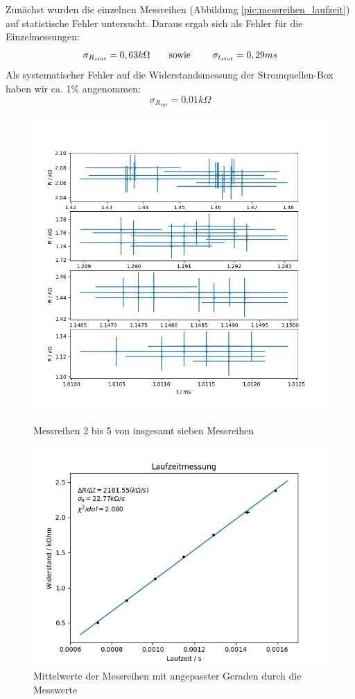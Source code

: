 \documentclass[a4paper]{article}
\begin{document}
	Zunächst wurden die einzelnen Messreihen (Abbildung \ref{pic:messreihen_laufzeit}) auf statistische Fehler untersucht. Daraus ergab sich als Fehler für die Einzelmessungen:
	\begin{equation}
	\sigma _{R_{stat}} = 0,63 k\Omega \text{\qquad sowie \qquad} \sigma_{t_{stat}} = 0,29 ms
	\end{equation}
	Als systematischer Fehler auf die Widerstandsmessung der Stromquellen-Box haben wir ca. 1\% angenommen: 
	\begin{equation}
	\sigma_{R_{sys}} = 0.01 k \Omega
	\end{equation}
	\begin{figure}
	\begin{center}
		\includegraphics[width=0.75\linewidth]{messreihen_2bis5_laufzeit}
		\caption{Messreihen 2 bis 5 von insgesamt sieben Messreihen}
		\label{pic:messreihen_laufzeit}
		
		\includegraphics[width=0.7\linewidth]{fit_laufzeit}
		\caption{Mittelwerte der Messreihen mit angepasster Geraden durch die Messwerte}
		\label{pic:fit_laufzeit}
	\end{center}
	\end{figure}
\end{document}
